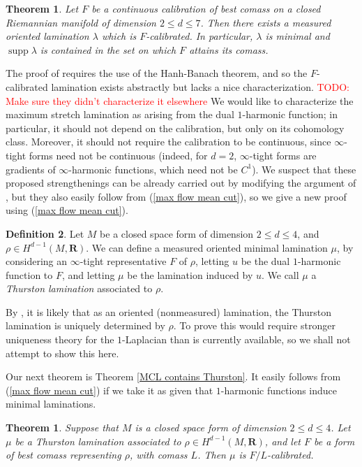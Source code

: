 \documentclass[reqno,11pt]{amsart}
\newcommand{\RR}{\mathbf{R}}
\DeclareMathOperator{\supp}{supp}
\newcommand{\dfn}[1]{\emph{#1}\index{#1}}
\newtheorem{theorem}{Theorem}[section]
\newtheorem{mainthm}{Theorem}
\theoremstyle{definition}
\newtheorem{definition}[theorem]{Definition}
\numberwithin{equation}{section}
\newcommand\todo[1]{\textcolor{red}{TODO: #1}}
\begin{document}
\begin{theorem}
Let $F$ be a continuous calibration of best comass on a closed Riemannian manifold of dimension $2 \leq d \leq 7$.
Then there exists a measured oriented lamination $\lambda$ which is $F$-calibrated.
In particular, $\lambda$ is minimal and $\supp \lambda$ is contained in the set on which $F$ attains its comass.
\end{theorem}

The proof of \cite{bangert_cui_2017} requires the use of the Hanh-Banach theorem, and so the $F$-calibrated lamination exists abstractly but lacks a nice characterization. \todo{Make sure they didn't characterize it elsewhere}
We would like to characterize the maximum stretch lamination as arising from the dual $1$-harmonic function; in particular, it should not depend on the calibration, but only on its cohomology class.
Moreover, it should not require the calibration to be continuous, since $\infty$-tight forms need not be continuous (indeed, for $d = 2$, $\infty$-tight forms are gradients of $\infty$-harmonic functions, which need not be $C^1$).
We suspect that these proposed strengthenings can be already carried out by modifying the argument of \cite{bangert_cui_2017}, but they also easily follow from (\ref{max flow mean cut}), so we give a new proof using (\ref{max flow mean cut}).

\begin{definition}
Let $M$ be a closed space form of dimension $2 \leq d \leq 4$, and $\rho \in H^{d - 1}(M, \RR)$.
We can define a measured oriented minimal lamination $\mu$, by considering an $\infty$-tight representative $F$ of $\rho$, letting $u$ be the dual $1$-harmonic function to $F$, and letting $\mu$ be the lamination induced by $u$.
We call $\mu$ a \dfn{Thurston lamination} associated to $\rho$.
\end{definition}

By \cite[Remark 2.8]{Mazon14}, it is likely that as an oriented (nonmeasured) lamination, the Thurston lamination is uniquely determined by $\rho$.
To prove this would require stronger uniqueness theory for the $1$-Laplacian than is currently available, so we shall not attempt to show this here.

Our next theorem is Theorem \ref{MCL contains Thurston}.
It easily follows from (\ref{max flow mean cut}) if we take it as given that $1$-harmonic functions induce minimal laminations.

\begin{mainthm}\label{lams are calibrated}
Suppose that $M$ is a closed space form of dimension $2 \leq d \leq 4$.
Let $\mu$ be a Thurston lamination associated to $\rho \in H^{d - 1}(M, \RR)$, and let $F$ be a form of best comass representing $\rho$, with comass $L$.
Then $\mu$ is $F/L$-calibrated.
\end{mainthm}
\end{document}
